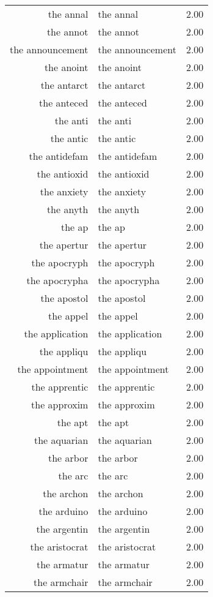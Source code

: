 \begin{table}[ht]
\begin{tabular}{rlr}
  the annal & the annal & 2.00 \\ 
  the annot & the annot & 2.00 \\ 
  the announcement & the announcement & 2.00 \\ 
  the anoint & the anoint & 2.00 \\ 
  the antarct & the antarct & 2.00 \\ 
  the anteced & the anteced & 2.00 \\ 
  the anti & the anti & 2.00 \\ 
  the antic & the antic & 2.00 \\ 
  the antidefam & the antidefam & 2.00 \\ 
  the antioxid & the antioxid & 2.00 \\ 
  the anxiety & the anxiety & 2.00 \\ 
  the anyth & the anyth & 2.00 \\ 
  the ap & the ap & 2.00 \\ 
  the apertur & the apertur & 2.00 \\ 
  the apocryph & the apocryph & 2.00 \\ 
  the apocrypha & the apocrypha & 2.00 \\ 
  the apostol & the apostol & 2.00 \\ 
  the appel & the appel & 2.00 \\ 
  the application & the application & 2.00 \\ 
  the appliqu & the appliqu & 2.00 \\ 
  the appointment & the appointment & 2.00 \\ 
  the apprentic & the apprentic & 2.00 \\ 
  the approxim & the approxim & 2.00 \\ 
  the apt & the apt & 2.00 \\ 
  the aquarian & the aquarian & 2.00 \\ 
  the arbor & the arbor & 2.00 \\ 
  the arc & the arc & 2.00 \\ 
  the archon & the archon & 2.00 \\ 
  the arduino & the arduino & 2.00 \\ 
  the argentin & the argentin & 2.00 \\ 
  the aristocrat & the aristocrat & 2.00 \\ 
  the armatur & the armatur & 2.00 \\ 
  the armchair & the armchair & 2.00 \\ 

\end{tabular}
\end{table}

